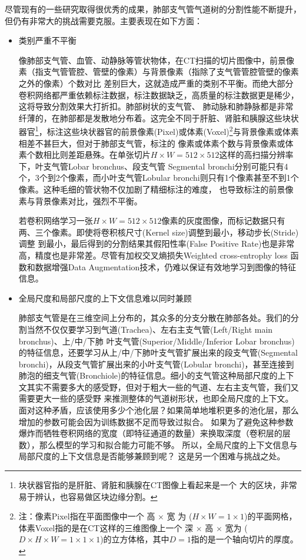 尽管现有的一些研究取得很优秀的成果，肺部支气管气道树的分割性能不断提升，但仍有非常大的挑战需要克服。主要表现在如下方面：
\begin{itemize}
	\item {\heiti 类别严重不平衡}
	
	像肺部支气管、血管、动静脉等管状物体，在CT扫描的切片图像中，前景像素（指支气管管腔、管壁的像素）与背景像素（指除了支气管管腔管壁的像素之外的像素）个数对比
	差别巨大，这就造成严重的类别不平衡。而绝大部分卷积网络都严重依赖标注数据，标注数据缺乏，高质量的标注数据更是稀少，这将导致分割效果大打折扣。肺部树状的支气管、
	肺动脉和肺静脉都是非常纤薄的，在肺部都是发散地分布着。这完全不同于肝脏、肾脏和胰腺这些块状器官\footnote{块状器官指的是肝脏、肾脏和胰腺在CT图像上看起来是一个
	大的区块，非常易于辨认，也容易做区块边缘分割。}，标注这些块状器官的前景像素(Pixel)或体素(Voxel)\footnote{注：像素Pixel指在平面图像中一个 高 $\times$ 宽 为
	($H \times W = 1 \times 1$)的平面网格，体素Voxel指的是在CT这样的三维图像上一个 深 $\times$ 高 $\times$ 宽为
	($D \times H \times W = 1 \times 1 \times 1$)的立方体格，其中$D = 1$指的是一个轴向切片的厚度。}与背景像素或体素相差不甚巨大，但对于肺部支气管，标注的
	像素或体素个数与背景像素或体素个数相比则差距悬殊。在单张切片$H \times W = 512 \times 512$这样的高扫描分辨率下，叶支气管Lobar bronchus、段支气管
	Segmental bronchi分别可能只有4个，3个到2个像素，而小叶支气管Lobular bronchi则只有1个像素甚至不到1个像素。这种毛细的管状物不仅加剧了精细标注的难度，
	也导致标注的前景像素与背景像素对比，强烈不平衡。
	
	若卷积网络学习一张$H \times W = 512 \times 512$像素的灰度图像，而标记数据只有两、三个像素。即使将卷积核尺寸(Kernel size)调整到最小，移动步长(Stride)调整
	到最小，最后得到的分割结果其假阳性率(False Positive Rate)也是非常高，精度也是非常差。尽管有加权交叉熵损失Weighted cross-entrophy loss
	\cite{Yuri2019WeightedCrossEntrophy}函数和数据增强Data Augmentation技术，仍难以保证有效地学习到图像的特征信息。
	
	\item {\heiti 全局尺度和局部尺度的上下文信息难以同时兼顾}
	
	肺部支气管是在三维空间上分布的，其众多的分支分散在肺部各处。我们的分割当然不仅仅要学习到气道(Trachea)、左右主支气管(Left/Right main bronchus)、上/中/下肺
	叶支气管(Superior/Middle/Inferior Lobar bronchus)的特征信息，还要学习从上/中/下肺叶支气管扩展出来的段支气管(Segmental bronchi)，从段支气管扩展出来的小叶支气管(Lobular bronchi)，甚至连接到肺泡的细支气管(Bronchiole)的特征信息。细小的支气管这种局部尺度的上下文其实不需要多大的感受野，但对于粗大一些的气道、左右主支气管，我们又需要更大一些的感受野
	来推测整体的气道树形状，也即全局尺度的上下文。面对这种矛盾，应该使用多少个池化层？如果简单地堆积更多的池化层，那么增加的参数可能会因为训练数据不足而导致过拟合。
	如果为了避免这种参数爆炸而牺牲卷积网络的宽度（即特征通道的数量）来换取深度（卷积层的层数），那么模型的学习和拟合能力可能不够\cite{Qin2021TubuleSen}。
	所以，全局尺度的上下文信息与局部尺度的上下文信息是否能够兼顾到呢？ 这是另一个困难与挑战之处。
\end{itemize}


